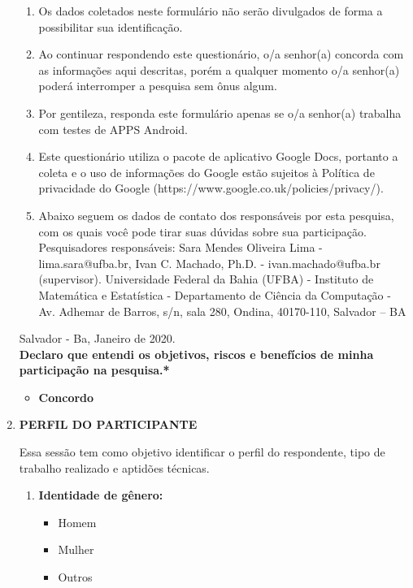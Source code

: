 \begin{enumerate}[label=\bf A\arabic*,leftmargin=1.8cm]
\begin{enumerate}[label= \arabic*]
        \item Os dados coletados neste formulário não serão divulgados de forma a possibilitar sua identificação.
        \item Ao continuar respondendo este questionário, o/a senhor(a) concorda com as informações aqui descritas, porém a qualquer momento o/a senhor(a) poderá interromper a pesquisa sem ônus algum.
        \item Por gentileza, responda este formulário apenas se o/a senhor(a) trabalha com testes de \ac{APPS} Android.
        \item Este questionário utiliza o pacote de aplicativo Google Docs, portanto a coleta e o uso de informações do Google estão sujeitos à Política de privacidade do Google (https://www.google.co.uk/policies/privacy/).
        \item Abaixo seguem os dados de contato dos responsáveis por esta pesquisa, com os quais você pode tirar suas dúvidas sobre sua participação. Pesquisadores responsáveis: Sara Mendes Oliveira Lima - lima.sara@ufba.br, Ivan C. Machado, Ph.D. - ivan.machado@ufba.br (supervisor). Universidade Federal da Bahia (UFBA) - Instituto de Matemática e Estatística - Departamento de Ciência da Computação - Av. Adhemar de Barros, s/n, sala 280, Ondina, 40170-110, Salvador – BA
    \end{enumerate}
    
    
    Salvador - Ba, Janeiro de 2020.\\
    
    
    
    \textbf{Declaro que entendi os objetivos, riscos e benefícios de minha participação na pesquisa.*}

    \begin{itemize}
        \item \textbf{Concordo}
    \end{itemize}
    
    

    \item \textbf{PERFIL DO PARTICIPANTE}
    
    Essa sessão tem como objetivo identificar o perfil do respondente, tipo de trabalho realizado e aptidões técnicas.
    
     \begin{enumerate}[label= \arabic*]
     
        \item \textbf{Identidade de gênero:}
        \begin{itemize}
            \item Homem
            \item Mulher
            \item Outros
        \end{itemize}
        

\end{enumerate}
\end{enumerate}
